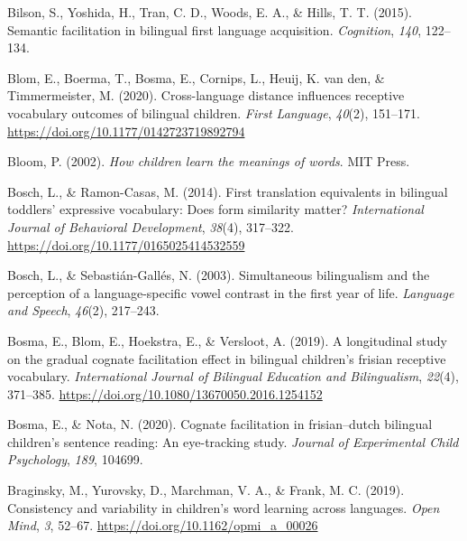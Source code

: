 \documentclass[
  man,
  floatsintext,
  colorlinks=true,linkcolor=blue,citecolor=blue,urlcolor=blue,biblatex]{apa7}
\newlength{\cslhangindent}
\newlength{\cslentryspacingunit} %
\newenvironment{CSLReferences}[2] %
 {%
  \setlength{\parindent}{0pt}
  \ifodd #1
  \let\oldpar\par
  \def\par{\hangindent=\cslhangindent\oldpar}
  \fi
  \setlength{\parskip}{#2\cslentryspacingunit}
 }%
 {}
\begin{document}
\begin{CSLReferences}{1}{0}
\leavevmode{}%
Bilson, S., Yoshida, H., Tran, C. D., Woods, E. A., \& Hills, T. T.
(2015). Semantic facilitation in bilingual first language acquisition.
\emph{Cognition}, \emph{140}, 122--134.

\leavevmode{}%
Blom, E., Boerma, T., Bosma, E., Cornips, L., Heuij, K. van den, \&
Timmermeister, M. (2020). Cross-language distance influences receptive
vocabulary outcomes of bilingual children. \emph{First Language},
\emph{40}(2), 151--171. \url{https://doi.org/10.1177/0142723719892794}

\leavevmode{}%
Bloom, P. (2002). \emph{How children learn the meanings of words}. {MIT}
Press.

\leavevmode{}%
Bosch, L., \& Ramon-Casas, M. (2014). First translation equivalents in
bilingual toddlers' expressive vocabulary: Does form similarity matter?
\emph{International Journal of Behavioral Development}, \emph{38}(4),
317--322. \url{https://doi.org/10.1177/0165025414532559}

\leavevmode{}%
Bosch, L., \& Sebastián-Gallés, N. (2003). Simultaneous bilingualism and
the perception of a language-specific vowel contrast in the first year
of life. \emph{Language and Speech}, \emph{46}(2), 217--243.

\leavevmode{}%
Bosma, E., Blom, E., Hoekstra, E., \& Versloot, A. (2019). A
longitudinal study on the gradual cognate facilitation effect in
bilingual children's frisian receptive vocabulary. \emph{International
Journal of Bilingual Education and Bilingualism}, \emph{22}(4),
371--385. \url{https://doi.org/10.1080/13670050.2016.1254152}

\leavevmode{}%
Bosma, E., \& Nota, N. (2020). Cognate facilitation in frisian--dutch
bilingual children's sentence reading: An eye-tracking study.
\emph{Journal of Experimental Child Psychology}, \emph{189}, 104699.

\leavevmode{}%
Braginsky, M., Yurovsky, D., Marchman, V. A., \& Frank, M. C. (2019).
Consistency and variability in children's word learning across
languages. \emph{Open Mind}, \emph{3}, 52--67.
\url{https://doi.org/10.1162/opmi_a_00026}


\end{CSLReferences}
\end{document}
